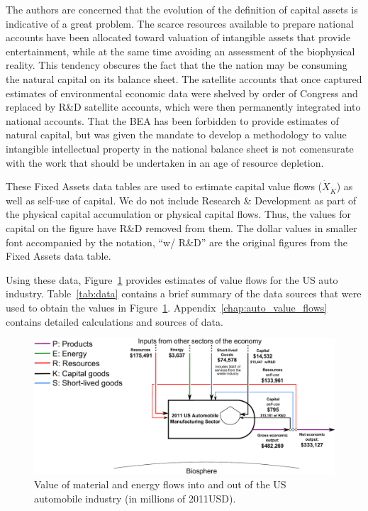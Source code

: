 The authors are concerned that the 
 evolution of the definition of capital assets 
is indicative of a great problem. The scarce 
resources available to prepare national
accounts have been allocated toward
 valuation of intangible assets that provide
entertainment, while at the same time avoiding an assessment
of the biophysical reality.
This tendency obscures the fact that the the nation may be 
consuming the natural capital on its 
balance sheet. The satellite accounts that once
captured estimates of environmental economic
data were shelved by order of Congress and
replaced by R\&D satellite accounts, which 
were then permanently integrated into national accounts. 
That the BEA has been
forbidden to provide estimates of natural capital,
but was given the mandate to develop a
methodology to value intangible
intellectual property in the national balance
sheet is not comensurate with the work
that should be undertaken in an age of
resource depletion. 


These Fixed Assets data tables are used to estimate capital value flows 
($\dot{X}_{\dot{K}}$) as well as self-use of capital. We
do not include Research \& Development as part
of the physical capital accumulation or physical 
capital flows. Thus, the values for capital on the figure
have R\&D removed from them. The dollar values in
smaller font accompanied by the notation, ``w/ R\&D''
are the original figures from the Fixed Assets data table.


Using these data, Figure~\ref{fig:PERKS_value_auto_ind} provides estimates 
of value flows for the US auto industry.
Table~\ref{tab:data} contains a brief summary  
of the data sources that were used 
to obtain the values in Figure~\ref{fig:PERKS_value_auto_ind}. 
Appendix~\ref{chap:auto_value_flows} contains
detailed calculations and sources of data.

\begin{landscape}
\begin{figure}[!ht]
\centering
\includegraphics[width=0.8\linewidth]{Part_2/Chapter_Values/images/PERKS_basic_unit_value_auto_ind.pdf}
\caption[Value of material and energy flows 
into and out of the US automobile industry]{Value 
of material and energy flows into and out of the 
US automobile industry (in millions of 2011USD).}
\label{fig:PERKS_value_auto_ind}
\end{figure}
\end{landscape}

